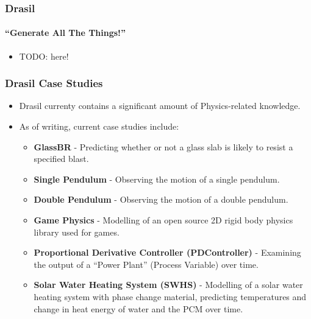 \documentclass{beamer}
\begin{document}
\begin{frame}
    \frametitle{Drasil}
    \framesubtitle{``Generate All The Things!''}
    
    \begin{itemize}
        \item TODO: here!
    \end{itemize}
\end{frame}

\begin{frame}
    \frametitle{Drasil Case Studies}
    \begin{itemize}
        \item<2-> Drasil currenty contains a significant amount of Physics-related knowledge.
        \item<3-> As of writing, current case studies include:
            \begin{itemize}
                \item<4-> \textbf{GlassBR} - Predicting whether or not a glass slab is likely to resist a specified blast.
                \item<5-> \textbf{Single Pendulum} - Observing the motion of a single pendulum.
                \item<6-> \textbf{Double Pendulum} - Observing the motion of a double pendulum.
                \item<7-> \textbf{Game Physics} - Modelling of an open source 2D rigid body physics library used for games.
                \item<8-> \textbf{Proportional Derivative Controller (PDController)} - Examining the output of a ``Power Plant'' (Process Variable) over time.
                \item<9-> \textbf{Solar Water Heating System (SWHS)} - Modelling of a solar water heating system with phase change material, predicting temperatures and change in heat energy of water and the PCM over time.
            \end{itemize}
    \end{itemize}
\end{frame}
\end{document}
